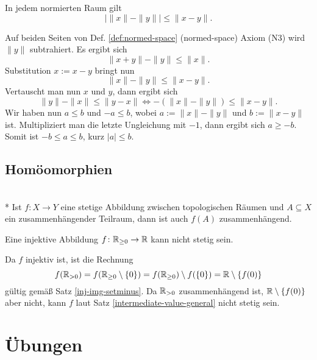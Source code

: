 \begin{Satz}%
\label{rev-tineq}%
In jedem normierten Raum gilt
\[|\|x\|-\|y\|| \le \|x-y\|.\]
\end{Satz}
\begin{Beweis}
Auf beiden Seiten von Def. \ref{def:normed-space} (normed-space)
Axiom (N3) wird $\|y\|$ subtrahiert.
Es ergibt sich
\[\|x+y\| - \|y\| \le \|x\|.\]
Substitution $x:=x-y$ bringt nun
\[\|x\| - \|y\| \le \|x-y\|.\]
Vertauscht man nun $x$ und $y$, dann ergibt sich
\[\|y\|-\|x\| \le \|y-x\| \iff -(\|x\|-\|y\|)\le \|x-y\|.\]
Wir haben nun $a\le b$ und $-a\le b$,
wobei $a:=\|x\|-\|y\|$ und $b:=\|x-y\|$ ist. Multipliziert
man die letzte Ungleichung mit $-1$, dann ergibt sich $a\ge -b$.
Somit ist $-b\le a\le b$, kurz $|a|\le b$.\,\qedsymbol
\end{Beweis}

\subsection{Homöomorphien}
\begin{Satz}%
\label{intermediate-value-general}\mbox{}\\*
Ist $f\colon X\to Y$ eine stetige Abbildung zwischen topologischen
Räumen und $A\subseteq X$ ein zusammenhängender Teilraum,
dann ist auch $f(A)$ zusammenhängend.
\end{Satz}

\begin{Satz}
Eine injektive Abbildung $f\colon\mathbb R_{\ge 0}\to\mathbb R$ kann nicht stetig sein.
\end{Satz}
\begin{Beweis}
Da $f$ injektiv ist, ist die Rechnung
\[f(\mathbb R_{>0}) = f(\mathbb R_{\ge 0}\setminus\{0\})
= f(\mathbb R_{\ge 0})\setminus f(\{0\}) = \mathbb R\setminus\{f(0)\}\]
gültig gemäß Satz \ref{inj-img-setminus}. Da $\mathbb R_{>0}$ zusammenhängend
ist, $\mathbb R\setminus\{f(0)\}$ aber nicht, kann $f$ laut Satz
\ref{intermediate-value-general} nicht stetig sein.\,\qedsymbol
\end{Beweis}

\section{Übungen}

